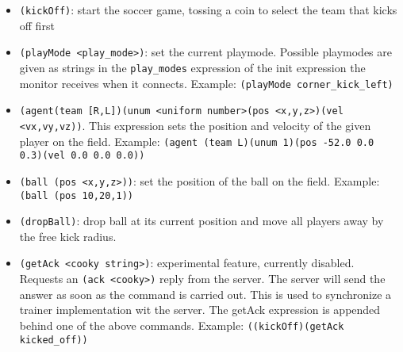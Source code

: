 \begin{itemize}
  
\item \texttt{(kickOff)}: start the soccer game, tossing a coin to
  select the team that kicks off first
  
\item \texttt{(playMode <play\_mode>)}: set the current playmode.
  Possible playmodes are given as strings in the \texttt{play\_modes}
  expression of the init expression the monitor receives when it
  connects.  Example: \texttt{(playMode corner\_kick\_left)}
  
\item \texttt{(agent(team [R,L])(unum <uniform number>(pos
    <x,y,z>)(vel <vx,vy,vz))}. This expression sets the position and
  velocity of the given player on the field. Example: \texttt{(agent
    (team L)(unum 1)(pos -52.0 0.0 0.3)(vel 0.0 0.0 0.0))}
  
\item \texttt{(ball (pos <x,y,z>))}: set the position of the ball on
  the field. Example: \texttt{(ball (pos 10,20,1))}
  
\item \texttt{(dropBall)}: drop ball at its current position and move
  all players away by the free kick radius.
  
\item \texttt{(getAck <cooky string>)}: experimental feature,
  currently disabled. Requests an \texttt{(ack <cooky>)} reply from
  the server.  The server will send the answer as soon as the command
  is carried out. This is used to synchronize a trainer implementation
  wit the server. The getAck expression is appended behind one of the
  above commands. Example: \texttt{((kickOff)(getAck kicked\_off))}

\end{itemize}







